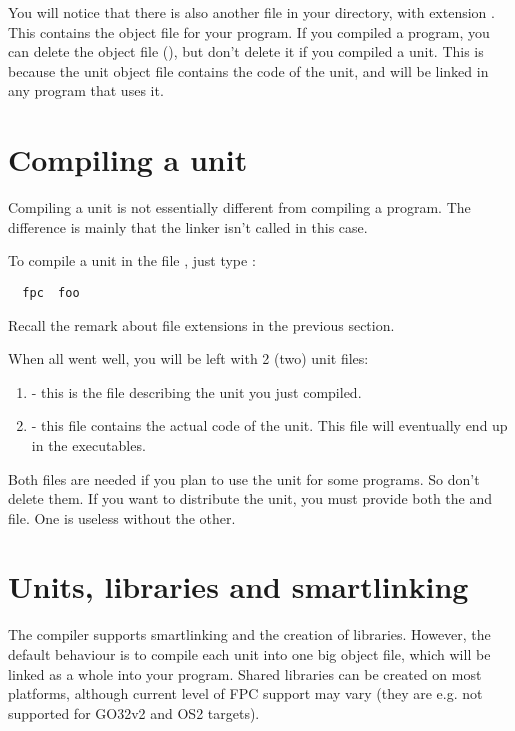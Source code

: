 You will notice that there is also another file in your directory, with
extension . This contains the object file for your program.
If you compiled a program, you can delete the object file (),
but don't delete it if you compiled a unit. This is because
the unit object file contains the code of the unit, and will be
linked in any program that uses it.



\section{Compiling a unit}

Compiling a unit is not essentially different from compiling a program.
The difference is mainly that the linker isn't called in this case.

To compile a unit in the file , just type :
\begin{verbatim}
  fpc  foo
\end{verbatim}
Recall the remark about file extensions in the previous section.

When all went well, you will be left with 2 (two) unit files:
\begin{enumerate}
\item {} - this is the file describing the unit you just
compiled.
\item {} - this file contains the actual code of the unit.
This file will eventually end up in the executables.
\end{enumerate}
Both files are needed if you plan to use the unit for some programs.
So don't delete them. If you want to distribute the unit, you must
provide both the  and  file. One is useless without the
other.

\section{Units, libraries and smartlinking}
The \fpc compiler supports smartlinking and the creation of libraries.
However, the default behaviour is to compile each unit into one big object
file, which will be linked as a whole into your program.
Shared libraries can be created on most platforms, although current level
of FPC support may vary (they are e.g. not supported for GO32v2 and OS2
targets).

